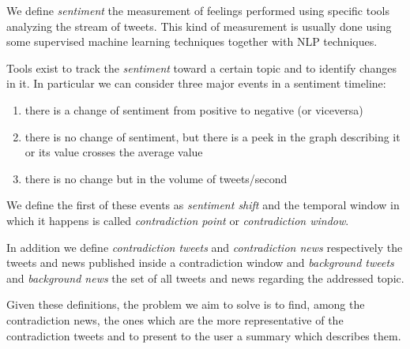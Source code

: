 We define \emph{sentiment} the measurement of feelings performed using specific
tools analyzing the stream of tweets. This kind of measurement is usually done
using some supervised machine learning techniques together with NLP techniques.

Tools exist to track the \emph{sentiment} toward a certain topic and to identify
changes in it. In particular we can consider three major events in a sentiment
timeline:
\begin{enumerate}
	\item there is a change of sentiment from positive to negative (or
		viceversa)
	\item there is no change of sentiment, but there is a peek in the graph
		describing it or its value crosses the average value
	\item there is no change but in the volume of tweets/second
\end{enumerate}
We define the first of these events as \emph{sentiment shift} and the temporal
window in which it happens is called \emph{contradiction point} or
\emph{contradiction window}.

In addition we define \emph{contradiction tweets} and \emph{contradiction news}
respectively the tweets and news published inside a contradiction window and
\emph{background tweets} and \emph{background news} the set of all tweets and
news regarding the addressed topic.

Given these definitions, the problem we aim to solve is to find, among the
contradiction news, the ones which are the more representative of the
contradiction tweets and to present to the user a summary which describes them.
